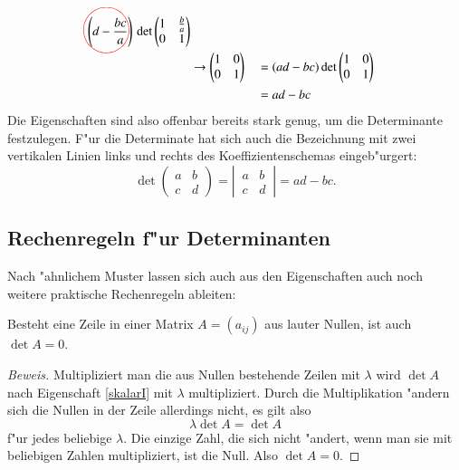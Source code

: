 \begin{align*}
\;
\left(d-\frac{bc}a\right)%
\begin{picture}(0,0)
\color{red}\put(-22.5,4){\circle{35}}
\end{picture}%
\det\begin{pmatrix}1&\frac{b}{a}\\0&1\end{pmatrix}
\\
&\rightarrow
\begin{pmatrix}1&0\\0&1\end{pmatrix}
&
&=(ad-bc)
\det \begin{pmatrix}1&0\\0&1\end{pmatrix}
\\
&&&=ad-bc
\end{align*}
Die Eigenschaften sind also offenbar bereits stark genug, um die
Determinante festzulegen. F"ur die Determinate hat sich auch die
Bezeichnung mit zwei vertikalen Linien links und rechts des
Koeffizientenschemas eingeb"urgert:
\[
\det\begin{pmatrix}a&b\\c&d\end{pmatrix}
=
\left|\,\begin{matrix}a&b\\c&d\end{matrix}\,\right|
=
ad-bc.
\]

\subsection{Rechenregeln f"ur Determinanten}
Nach "ahnlichem Muster lassen sich auch aus den Eigenschaften auch
noch weitere praktische Rechenregeln ableiten:

\begin{hilfssatz}
Besteht eine Zeile in einer Matrix $A=(a_{ij})$ aus
lauter Nullen, ist auch $\det A=0$.
\label{nullzeile}
\end{hilfssatz}

\begin{proof}[Beweis]
Multipliziert man die aus Nullen bestehende Zeilen mit $\lambda$
wird $\det A$ nach Eigenschaft \ref{skalarI}  mit $\lambda$ multipliziert.
Durch die Multiplikation "andern sich die Nullen in der Zeile allerdings
nicht, es gilt also
\[
\lambda \det A=\det A
\]
f"ur jedes beliebige $\lambda$. Die einzige Zahl, die sich nicht "andert,
wenn man sie mit beliebigen Zahlen multipliziert, ist die Null. Also
$\det A=0$.
\end{proof}

